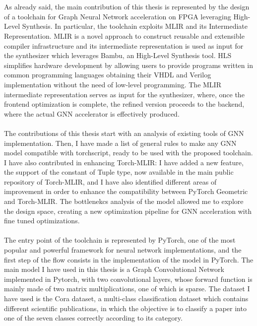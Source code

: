 \documentclass{article}
\begin{document}
\\
\\
\noindent
As already said, the main contribution of this thesis is represented by the design of a toolchain for Graph Neural Network acceleration on FPGA leveraging High-Level Synthesis.
In particular, the toolchain exploits MLIR and its Intermediate Representation.
MLIR is a novel approach to construct reusable and extensible compiler infrastructure and its intermediate representation is used as input for the synthesizer which leverages Bambu, an High-Level Synthesis tool.
HLS simplifies hardware development by allowing users to provide programs written in common programming languages obtaining their VHDL and Verilog implementation without the need of low-level programming.
The MLIR intermediate representation serves as input for the synthesizer, where, once the frontend optimization is complete, the refined version proceeds to the backend, where the actual GNN accelerator is effectively produced.
\\
\\
\noindent
The contributions of this thesis start with an analysis of existing tools of GNN implementation.
Then, I have made a list of general rules to make any GNN model compatible with torchscript, ready to be used with the proposed toolchain.
I have also contributed in enhancing Torch-MLIR: I have added a new feature, the support of the constant of Tuple type, now available in the main public repository of Torch-MLIR, and I have also identified different areas of improvement in order to enhance the compatibility between PyTorch Geometric and Torch-MLIR.
The bottlenekcs analysis of the model allowed me to explore the design space, creating a new optimization pipeline for GNN acceleration with fine tuned optimizations.
\\
\\
\noindent
The entry point of the toolchain is represented by PyTorch, one of the most popular and powerful framework for neural network implementations, and the first step of the flow consists in the implementation of the model in PyTorch.
The main model I have used in this thesis is a Graph Convolutional Network implemented in Pytorch, with two convolutional layers, whose forward function is mainly made of two matrix multiplications, one of which is sparse.
The dataset I have used is the Cora dataset, a multi-class classification dataset which contains different scientific publications, in which the objective is to classify a paper into one of the seven classes correctly according to its category.
\end{document}
